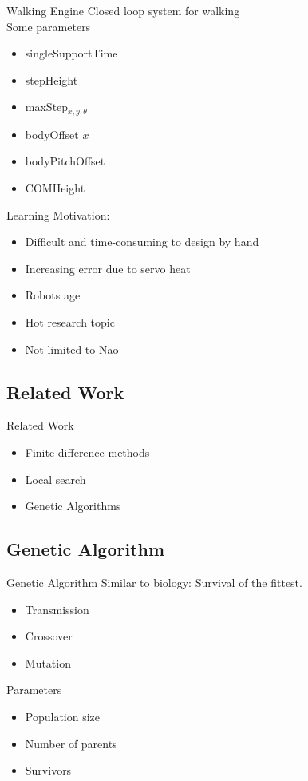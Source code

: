 \documentclass{beamer}
\begin{document}
\begin{frame}{Walking Engine}
	Closed loop system for walking\\
	Some parameters
	\begin{itemize}
		\item singleSupportTime
		\item stepHeight
		\item maxStep$_{x, y, \theta}$
		\item bodyOffset $x$
		\item bodyPitchOffset
		\item COMHeight
	\end{itemize}
\end{frame}		

\begin{frame}{Learning}
	Motivation:
	\begin{itemize}
		\item Difficult and time-consuming to design by hand
		\item Increasing error due to servo heat
		\item Robots age
		\item Hot research topic
		\item Not limited to Nao
	\end{itemize}
\end{frame}

\subsection{Related Work}
\begin{frame}{Related Work}
    \begin{itemize}
		\item Finite difference methods \cite{macalpineusing, meijer2012getting}
		\item Local search
        \item Genetic Algorithms \cite{meijer2012getting}
	\end{itemize}
\end{frame}

\subsection{Genetic Algorithm}
\begin{frame}{Genetic Algorithm}
	Similar to biology: Survival of the fittest.
    \begin{itemize}
		\item Transmission
		\item Crossover
		\item Mutation
	\end{itemize}


    Parameters
	\begin{itemize}
		\item Population size 
		\item Number of parents
		\item Survivors
	\end{itemize}
\end{frame}
\end{document}

